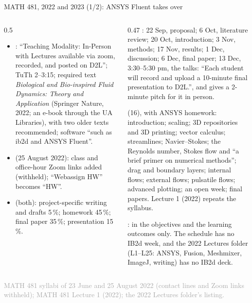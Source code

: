 \documentclass[aspectratio=169,11pt]{beamer}
\newcommand{\sourcecredit}[1]{\vfill\begin{flushright}\tiny\textcolor{DarkGray}{#1}\end{flushright}}
\begin{document}
\begin{frame}{MATH 481, 2022 and 2023 (1/2): ANSYS Fluent takes over}
\label{fr:m481d}
\begin{columns}[T,onlytextwidth]
\begin{column}{0.5\textwidth}
\footnotesize
\begin{itemize}\setlength{\itemsep}{3pt}
  \item {}: ``Teaching Modality: In-Person with Lectures available via zoom, recorded, and posted on D2L''; TuTh 2--3:15; required text \emph{Biological and Bio-inspired Fluid Dynamics: Theory and Application} (Springer Nature, 2022; an e-book through the UA Libraries), with two older texts recommended; software ``such as ib2d and ANSYS Fluent''.
  \item {} (25 August 2022): class and office-hour Zoom links added (withheld); ``Webassign HW'' becomes ``HW''.
  \item {} (both): project-specific writing and drafts 5\,\%; homework 45\,\%; final paper 35\,\%; presentation 15\,\%.
\end{itemize}
\end{column}
\begin{column}{0.47\textwidth}
\scriptsize
{}: 22 Sep, proposal; 6 Oct, literature review; 20 Oct, introduction; 3 Nov, methods; 17 Nov, results; 1 Dec, discussion; 6 Dec, final paper; 13 Dec, 3:30--5:30 pm, the talks: ``Each student will record and upload a 10-minute final presentation to D2L.'', and gives a 2-minute pitch for it in person.

\vspace{1.5mm}
 (16), with ANSYS homework: introduction; scaling; 3D repositories and 3D printing; vector calculus; streamlines; Navier--Stokes; the Reynolds number, Stokes flow and ``a brief primer on numerical methods''; drag and boundary layers; internal flows; external flows; pulsatile flows; advanced plotting; an open week; final papers. Lecture 1 (2022) repeats the syllabus.

\vspace{1.5mm}
: in the objectives and the learning outcomes only. The schedule has no IB2d week, and the 2022 Lectures folder (L1--L25: ANSYS, Fusion, Meshmixer, ImageJ, writing) has no IB2d deck.
\end{column}
\end{columns}
\sourcecredit{MATH 481 syllabi of 23 June and 25 August 2022 (contact lines and Zoom links withheld); MATH 481 Lecture 1 (2022); the 2022 Lectures folder's listing.}
\end{frame}
\end{document}

